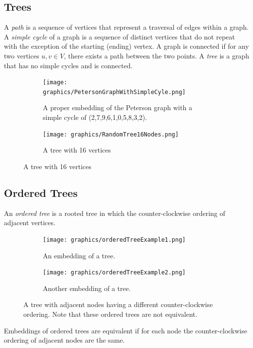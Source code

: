 \subsection{Trees}
A \textit{path} is a sequence of vertices that represent a traversal of edges within a 
graph.  
A \textit{simple  cycle} of a graph is a sequence of 
distinct vertices that do not repeat 
with the exception of the starting (ending) vertex.  A 
graph is connected if for any two vertices $u,v \in V$, there exists a path between the two points.
A \textit{tree} is a graph that has no simple cycles and is connected.
\begin{figure}[h]
\begin{center}
  \begin{subfigure}[b]{0.49\textwidth}
    \texttt{[image: graphics/PetersonGraphWithSimpleCyle.png]}
    \caption{A proper embedding of the Peterson graph with a simple cycle of 
    (2,7,9,6,1,0,5,8,3,2).}\label{fig:ch1-graph-2}
  \end{subfigure}
  \begin{subfigure}[b]{0.49\textwidth}
    \texttt{[image: graphics/RandomTree16Nodes.png]}
    \caption{A tree with 16 vertices}\label{fig:ch1-graph-3}
  \end{subfigure}
\end{center}
\end{figure}
\subsection{Ordered Trees}
An \textit{ordered tree} is a rooted tree in which the counter-clockwise ordering of adjacent 
vertices.
\begin{figure}[h]
\begin{center}
  \begin{subfigure}[b]{0.4\textwidth}
    \texttt{[image: graphics/orderedTreeExample1.png]}
    \caption{An embedding of a tree.}\label{fig:ch1-graph-4}
  \end{subfigure}
  \begin{subfigure}[b]{0.4\textwidth}
    \texttt{[image: graphics/orderedTreeExample2.png]}
    \caption{Another embedding of a tree.}\label{fig:ch1-graph-5}
  \end{subfigure}
  \caption{A tree with adjacent nodes having a different counter-clockwise 
ordering.  Note that these ordered trees are not equivalent.}\label{fig:ch1-graph-6}
\end{center}
\end{figure}
Embeddings of ordered trees are equivalent if for each node the counter-clockwise ordering of 
adjacent nodes are the same.

